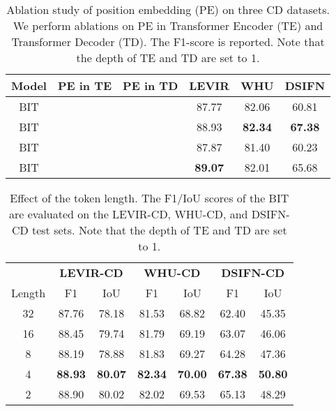 \documentclass[journal]{IEEEtran}
\begin{document}
\begin{table}
    \centering
    \caption{Ablation study of position embedding (PE) on three CD datasets. We perform ablations on PE in Transformer Encoder (TE) and Transformer Decoder (TD). The F1-score is reported. Note that the depth of TE and TD are set to 1.}
\begin{tabular}{cccccc}
    \toprule
    Model  &  PE in TE &  PE in TD & LEVIR & WHU & DSIFN \\
    \midrule
    BIT  &  &  & 87.77 & 82.06  & 60.81\\
    BIT  &  &  & 88.93  & \textbf{82.34}  &  \textbf{67.38}\\
    BIT  &  &  & 87.87  &  81.40  &  60.23\\
    BIT  &   &  & \textbf{89.07} &  82.01  &  65.68\\
    \bottomrule
    \end{tabular}
\label{tab:abalation_pe}
\end{table}
\begin{table}
    \centering
    \caption{Effect of the token length. The F1/IoU scores of the BIT are evaluated on the LEVIR-CD, WHU-CD, and DSIFN-CD test sets. Note that the depth of TE and TD are set to 1.}
\begin{tabular}{c|cc|cc|cc}
    \toprule
     \multicolumn{1}{c}{} &
    \multicolumn{2}{c|}{\textbf{LEVIR-CD}}  &  \multicolumn{2}{c|}{\textbf{WHU-CD}}  &
    \multicolumn{2}{c}{\textbf{DSIFN-CD}}  \\
    Length  &  F1 & IoU &  F1 & IoU  & F1 & IoU  \\
    \midrule
    32 &  87.76 & 78.18 &  81.53 & 68.82 & 62.40 & 45.35\\
    16  &  88.45 & 79.74 &  81.79 & 69.19  & 63.07 & 46.06\\
    8  & 88.19 & 78.88  & 81.83 & 69.27  & 64.28 & 47.36\\
    4 & \textbf{88.93} & \textbf{80.07} &  \textbf{82.34} & \textbf{70.00}  & \textbf{67.38} & \textbf{50.80} \\
    2 & 88.90 & 80.02  & 82.02 & 69.53  & 65.13 & 48.29 \\
    \bottomrule
    \end{tabular}
\label{tab:token_length}
\end{table}
\end{document}
